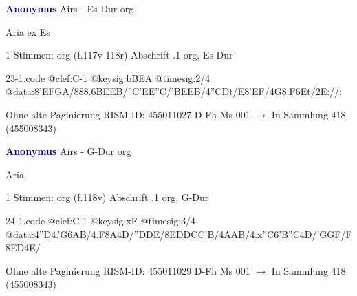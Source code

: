 \documentclass[twocolumn]{book}
\begin{document}
\newline \par \vspace{7pt} \textcolor{darkblue}{\textbf{Anonymus  }}
\newline Airs - Es-Dur
\newline org
\newline \begin{itshape}[f.117v, heading:] Aria ex Es\end{itshape} 
\newline \textcolor{darkblue}{}  1 Stimmen: org  (f.117v-118r)
\newline Abschrift
.1  org, Es-Dur  
\begin{filecontents*}{23-1.code}
@clef:C-1
@keysig:bBEA
@timesig:2/4
@data:{8'EF}{GA}/888.6{BE}{EB}/{''C'E}{E''C}/{'BE}{EB}/4''CDt/E{8'EF}/4G{8.F6Et}/2E://:
\end{filecontents*}
\newline
%
\newline Ohne alte Paginierung
\newline RISM-ID: 455011027
\newline D-Fh  Ms 001
\newline $\rightarrow$ In Sammlung 418 (455008343)
      
\newline \par \vspace{7pt} \textcolor{darkblue}{\textbf{Anonymus  }}
\newline Airs - G-Dur
\newline org
\newline \begin{itshape}[f.118v, heading:] Aria.\end{itshape} 
\newline \textcolor{darkblue}{}  1 Stimmen: org  (f.118v)
\newline Abschrift
.1  org, G-Dur  
\begin{filecontents*}{24-1.code}
@clef:C-1
@keysig:xF
@timesig:3/4
@data:4''D4.'G{6AB}/4.F8A4D/''DDE/{8EDDCC'B}/4AAB/4.x''C{6'B''C}4D/'GGF/F{8ED}4E/
\end{filecontents*}
\newline
%
\newline Ohne alte Paginierung
\newline RISM-ID: 455011029
\newline D-Fh  Ms 001
\newline $\rightarrow$ In Sammlung 418 (455008343)
      
\end{document}
